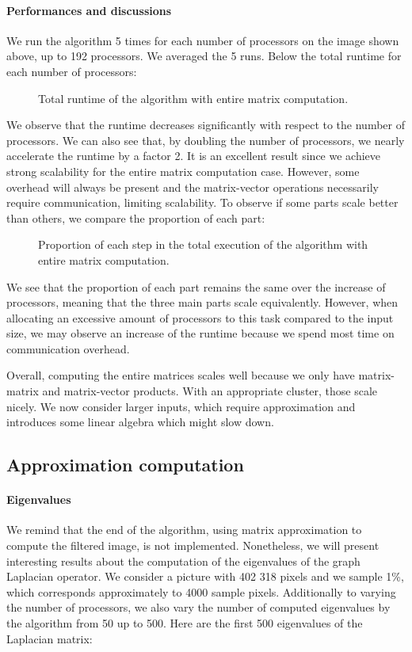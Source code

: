 \paragraph{Performances and discussions}
We run the algorithm 5 times for each number of processors on the image shown above, up to 192 processors.
We averaged the 5 runs.
Below the total runtime for each number of processors:
\begin{figure}[H]
  \centering
  
  \caption{Total runtime of the algorithm with entire matrix computation.}
\end{figure}

We observe that the runtime decreases significantly with respect to the number of processors.
We can also see that, by doubling the number of processors, we nearly accelerate the runtime by a factor 2.
It is an excellent result since we achieve strong scalability for the entire matrix computation case.
However, some overhead will always be present and the matrix-vector operations necessarily require communication, limiting scalability.
To observe if some parts scale better than others, we compare the proportion of each part:
\begin{figure}[H]
  \centering
  
  \caption{Proportion of each step in the total execution of the algorithm with entire matrix computation.}
\end{figure}

We see that the proportion of each part remains the same over the increase of processors, meaning that the three main parts scale equivalently.
However, when allocating an excessive amount of processors to this task compared to the input size, we may observe an increase of the runtime because we spend most time on communication overhead.

Overall, computing the entire matrices scales well because we only have matrix-matrix and matrix-vector products.
With an appropriate cluster, those scale nicely.
We now consider larger inputs, which require approximation and introduces some linear algebra which might slow down.

\subsection{Approximation computation}

\paragraph{Eigenvalues}
We remind that the end of the algorithm, using matrix approximation to compute the filtered image, is not implemented.
Nonetheless, we will present interesting results about the computation of the eigenvalues of the graph Laplacian operator.
We consider a picture with 402 318 pixels and we sample 1\%, which corresponds approximately to 4000 sample pixels.
Additionally to varying the number of processors, we also vary the number of computed eigenvalues by the algorithm from 50 up to 500.
Here are the first 500 eigenvalues of the Laplacian matrix:

